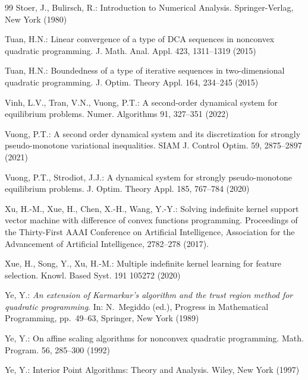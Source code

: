 \documentclass[11pt]{article}
\theoremstyle{definition}
\theoremstyle{remark}
\begin{document}
\begin{thebibliography}{99}
	  Stoer, J., Bulirsch, R.: Introduction to Numerical Analysis. Springer-Verlag, New York (1980) 
	
	
	 Tuan, H.N.:  Linear convergence of a type of DCA sequences in nonconvex quadratic programming. J. Math. Anal. Appl. 423, 1311--1319 (2015)
	
	 Tuan, H.N.: Boundedness of a type of iterative sequences in two-dimensional quadratic programming. J. Optim. Theory Appl. 164, 234--245 (2015)
	
	
	 Vinh, L.V., Tran, V.N., Vuong, P.T.: A second-order dynamical system for equilibrium problems.	Numer. Algorithms 91, 327--351 (2022)
	
	 Vuong, P.T.: A second order dynamical system and its discretization for strongly pseudo-monotone variational inequalities.
	SIAM J. Control Optim. 59, 2875--2897 (2021)
	
	 Vuong, P.T., Strodiot, J.J.: A dynamical system for strongly pseudo-monotone equilibrium problems. J. Optim. Theory Appl. 185, 767--784 (2020)
	
	 Xu, H.-M., Xue, H., Chen, X.-H., Wang, Y.-Y.: Solving indefinite kernel support vector machine with difference of convex functions programming. Proceedings of the Thirty-First AAAI Conference on Artificial Intelligence, Association for the Advancement of Artificial Intelligence, 2782--278 (2017).
	
	 Xue, H., Song, Y., Xu, H.-M.: Multiple indefinite kernel learning for feature selection. Knowl. Based Syst. 191 105272 (2020)
	
	 Ye, Y.: \textit{An extension of Karmarkar's algorithm and the trust region method for quadratic programming}. In: N.~Megiddo (ed.), Progress in Mathematical Programming, pp.~49--63, Springer, New York (1989)
	
	 Ye, Y.: On affine scaling algorithms for nonconvex quadratic programming. Math. Program.	56, 285--300 (1992)
	
	 Ye, Y.: Interior Point Algorithms: Theory and Analysis. Wiley, New York (1997) 
	
%	
	
	
	
\end{thebibliography}
\end{document}
